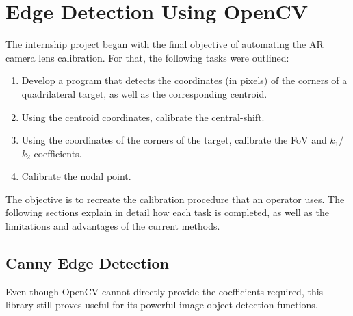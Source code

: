 \chapter{Edge Detection Using OpenCV} \label{chap:Edge Detection Using OpenCV}

The internship project began with the final objective of automating the \ac{AR} camera lens calibration. For that, the following tasks were outlined:
\begin{enumerate}
    \item Develop a program that detects the coordinates (in pixels) of the corners of a quadrilateral target, as well as the corresponding centroid.
    \item Using the centroid coordinates, calibrate the central-shift.
    \item Using the coordinates of the corners of the target, calibrate the FoV and \( k_1 \)/\( k_2 \) coefficients.
    \item Calibrate the nodal point.
\end{enumerate}

The objective is to recreate the calibration procedure that an operator uses. The following sections explain in detail how each task is completed, as well as the limitations and advantages of the current methods.



\section{Canny Edge Detection}
Even though OpenCV cannot directly provide the coefficients required, this library still proves useful for its powerful image object detection functions. 

